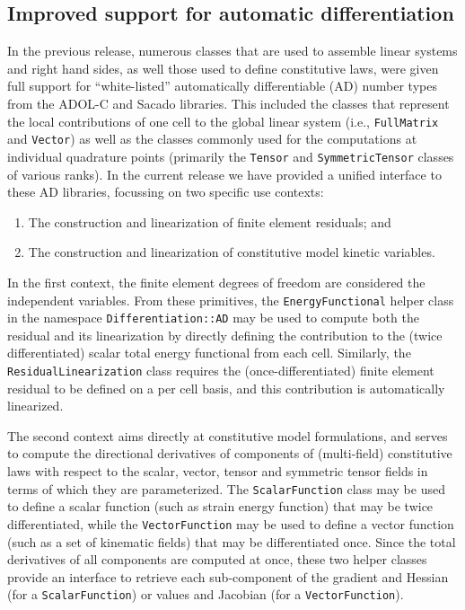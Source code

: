\documentclass{ansarticle-preprint}
\begin{document}
\subsection{Improved support for automatic differentiation}
\label{subsec:ad}

In the previous release, numerous classes that are used to assemble linear systems
and right hand sides, as well those used to define constitutive laws, were given 
full support for ``white-listed'' automatically differentiable (AD) number types 
from the ADOL-C and Sacado libraries. This included the classes that
represent the local contributions of one cell to the global linear
system (i.e., \texttt{FullMatrix} and \texttt{Vector}) as well as the
classes commonly used for the computations at individual quadrature
points (primarily the \texttt{Tensor} and \texttt{SymmetricTensor}
classes of various ranks).
In the current release we have provided a unified interface to these
AD libraries, focussing on two specific use contexts:
\begin{enumerate}
\item The construction and linearization of finite element residuals; and
\item The construction and linearization of constitutive model kinetic variables.
\end{enumerate}

In the first context, the finite element degrees of freedom are considered the
independent variables. From these primitives, the \texttt{EnergyFunctional} helper
class in the namespace \texttt{Differentiation::AD} may be used to compute both the 
residual and its linearization by directly defining the contribution to the 
(twice differentiated) scalar total energy functional from each cell. Similarly, 
the \texttt{ResidualLinearization} class requires the (once-differentiated) finite 
element residual to be defined on a per cell basis,  and this contribution is 
automatically linearized.

The second context aims directly at constitutive model formulations, and serves to
compute the directional derivatives of components of (multi-field) constitutive laws
with respect to the scalar, vector, tensor and symmetric tensor fields in terms 
of which they are parameterized. The \texttt{ScalarFunction} class may be used to 
define a scalar function (such as strain energy function) that may be twice 
differentiated, while the \texttt{VectorFunction} may be used to define a vector
function (such as a set of kinematic fields) that may be differentiated once.
Since the total derivatives of all components are computed at once, these two helper 
classes provide an interface to retrieve each sub-component of the gradient and 
Hessian (for a \texttt{ScalarFunction}) or values and Jacobian (for a 
\texttt{VectorFunction}).
\end{document}
